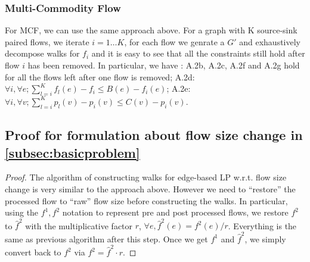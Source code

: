 \subsubsection{Multi-Commodity Flow}
For MCF, we can use the same approach above. For a graph with K source-sink paired flows,  we iterate $i = 1 \dots K$, for each flow we genrate a $G'$ and exhaustively decompose walks for $f_i$ and it is easy to see that all the constraints still hold after flow $i$ has been removed.  
In particular, we have :
A.2b, A.2c, A.2f and A.2g  hold for all the flows left after one flow is removed;
A.2d: $\forall i,\forall e;  \sum\limits_{l=i}^K f_l(e) - f_i\leq B(e) - f_i(e)$;
A.2e: $\forall i,\forall v;  \sum\limits_{l=i}^K p_l(v) -p_i(v)\leq C(v) - p_i(v)$.

\subsection{Proof for formulation about flow size change in \autoref{subsec:basicproblem}} \label{subsec:lppaths}
\begin{proof}
The algorithm of constructing walks for edge-based LP w.r.t. flow size change is very similar to the approach above. However we need to ``restore'' the processed flow to ``raw'' flow size before constructing the walks. In particular, using the $f^1, f^2$ notation to represent pre and post processed flows, we restore $f^2$ to $\hat{f}^2$ with the multiplicative factor $r$, $ \forall e, \hat{f}^2(e)=f^2(e)/r$. Everything is the same as previous algorithm after this step. Once we get $f^1$ and $\hat{f}^2$, we simply convert back to $f^2$ via $f^2= \hat{f}^2 \cdot r$.
\end{proof}